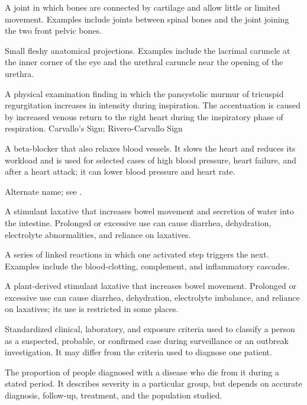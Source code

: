  A joint in which bones are connected by cartilage and allow little or limited movement. Examples include joints between spinal bones and the joint joining the two front pelvic bones.

 Small fleshy anatomical projections. Examples include the lacrimal caruncle at the inner corner of the eye and the urethral caruncle near the opening of the urethra.

 A physical examination finding in which the pansystolic murmur of tricuspid regurgitation increases in intensity during inspiration. The accentuation is caused by increased venous return to the right heart during the inspiratory phase of respiration.
\synonyms
Carvallo's Sign; Rivero-Carvallo Sign

 A beta-blocker that also relaxes blood vessels. It slows the heart and reduces its workload and is used for selected cases of high blood pressure, heart failure, and after a heart attack; it can lower blood pressure and heart rate.

 Alternate name; see .

 A stimulant laxative that increases bowel movement and secretion of water into the intestine. Prolonged or excessive use can cause diarrhea, dehydration, electrolyte abnormalities, and reliance on laxatives.

 A series of linked reactions in which one activated step triggers the next. Examples include the blood-clotting, complement, and inflammatory cascades.

 A plant-derived stimulant laxative that increases bowel movement. Prolonged or excessive use can cause diarrhea, dehydration, electrolyte imbalance, and reliance on laxatives; its use is restricted in some places.

 Standardized clinical, laboratory, and exposure criteria used to classify a person as a suspected, probable, or confirmed case during surveillance or an outbreak investigation. It may differ from the criteria used to diagnose one patient.

 The proportion of people diagnosed with a disease who die from it during a stated period. It describes severity in a particular group, but depends on accurate diagnosis, follow-up, treatment, and the population studied.


